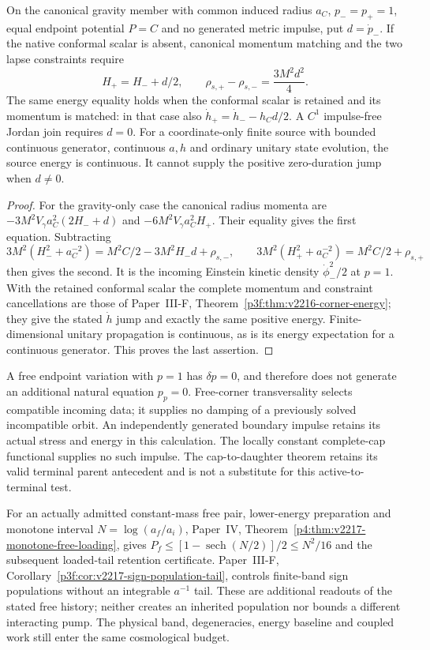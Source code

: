 \documentclass[12pt,a4paper]{article}
\begin{document}
\begin{corollary}
\label{p8:cor:v2216-corner-energy-import}
On the canonical gravity member with common induced radius $a_C$,
$p_-=p_+=1$, equal endpoint potential $P=C$ and no generated metric
impulse, put $d=\dot p_-$.  If the native conformal scalar is absent,
canonical momentum matching and the two lapse constraints require
\[
 H_+=H_-+d/2,\qquad
 \rho_{s,+}-\rho_{s,-}=\frac{3M^2d^2}{4}.
\]
The same energy equality holds when the conformal scalar is retained and
its momentum is matched: in that case also
$\dot h_+=\dot h_- -h_Cd/2$.
A $C^1$ impulse-free Jordan join requires $d=0$.
For a coordinate-only finite source with bounded continuous generator,
continuous $a,h$ and ordinary unitary state evolution, the source energy
is continuous.  It cannot supply the positive zero-duration jump when
$d\ne0$.
\end{corollary}
\begin{proof}
For the gravity-only case the canonical radius momenta are
$-3M^2V_\gamma a_C^2(2H_-+d)$ and
$-6M^2V_\gamma a_C^2H_+$.  Their equality gives the first equation.
Subtracting
\[
 3M^2(H_-^2+a_C^{-2})=M^2C/2-3M^2H_-d+\rho_{s,-},
 \qquad
 3M^2(H_+^2+a_C^{-2})=M^2C/2+\rho_{s,+}
\]
then gives the second.  It is the incoming Einstein kinetic density
$\dot\phi_-^2/2$ at $p=1$.  With the retained conformal scalar the
complete momentum and constraint cancellations are those of
Paper~III-F, Theorem~\ref{p3f:thm:v2216-corner-energy}; they give the
stated $\dot h$ jump and exactly the same positive energy.
Finite-dimensional unitary propagation is continuous, as is its energy
expectation for a continuous generator.  This proves the last assertion.
\end{proof}

A free endpoint variation with $p=1$ has $\delta p=0$, and therefore
does not generate an additional natural equation $p_p=0$.
Free-corner transversality selects compatible incoming data; it supplies
no damping of a previously solved incompatible orbit.  An independently
generated boundary impulse retains its actual stress and energy in this
calculation.  The locally constant complete-cap functional supplies no
such impulse.  The cap-to-daughter theorem retains its valid terminal
parent antecedent and is not a substitute for this active-to-terminal
test.

\begin{remark}
\label{p8:rem:v2217-free-pair-loading-import}
For an actually admitted constant-mass free pair, lower-energy preparation
and monotone interval $N=\log(a_f/a_i)$, Paper~IV,
Theorem~\ref{p4:thm:v2217-monotone-free-loading}, gives
$P_f\le[1-\operatorname{sech}(N/2)]/2\le N^2/16$ and the subsequent
loaded-tail retention certificate. Paper~III-F,
Corollary~\ref{p3f:cor:v2217-sign-population-tail}, controls finite-band
sign populations without an integrable $a^{-1}$ tail. These are additional
readouts of the stated free history; neither creates an inherited population
nor bounds a different interacting pump. The physical band, degeneracies,
energy baseline and coupled work still enter the same cosmological budget.
\end{remark}
\end{document}
